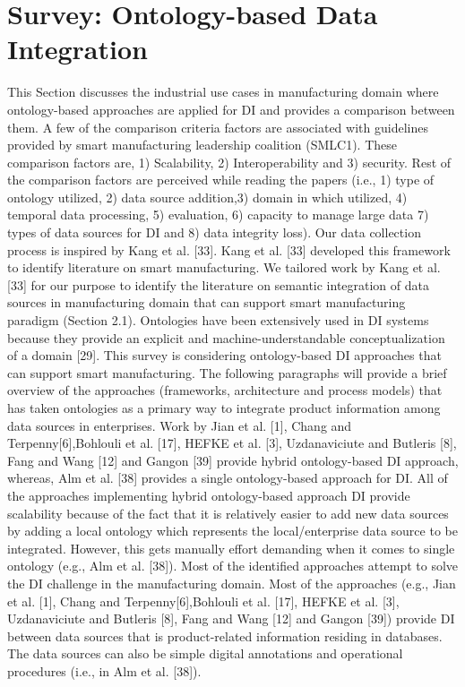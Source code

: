 \section{Survey: Ontology-based Data Integration}
\label{sec:Survey}
\vspace{-.3cm}
This Section discusses the industrial use cases in manufacturing domain where ontology-based approaches are applied for DI and provides a comparison between them. A few of the comparison criteria factors are associated with guidelines provided by smart manufacturing leadership coalition (SMLC1). These comparison factors are, 1) Scalability, 2) Interoperability and 3) security. Rest of the comparison factors are perceived while reading the papers (i.e., 1) type of ontology utilized, 2) data source addition,3) domain in which utilized, 4) temporal data processing, 5) evaluation, 6) capacity to manage large data 7) types of data sources for DI and 8) data integrity loss). Our data collection process is inspired by Kang et al. [33]. Kang et al. [33] developed this framework to identify literature on smart manufacturing. We tailored work by Kang et al. [33] for our purpose to identify the literature on semantic integration of data sources in manufacturing domain that can support smart manufacturing paradigm (Section 2.1).
Ontologies have been extensively used in DI systems because they provide an explicit and machine-understandable conceptualization of a domain [29]. This survey is considering ontology-based DI approaches that can support smart manufacturing. The following paragraphs will provide a brief overview of the approaches (frameworks, architecture and process models) that has taken ontologies as a primary way to integrate product information among data sources in enterprises.
Work by Jian et al. [1], Chang and Terpenny[6],Bohlouli et al. [17], HEFKE et al. [3], Uzdanaviciute and Butleris [8], Fang and Wang [12] and Gangon [39] provide hybrid ontology-based DI approach, whereas,  Alm et al. [38] provides a single ontology-based approach for DI. All of the approaches implementing hybrid ontology-based approach DI provide scalability because of the fact that it is relatively easier to add new data sources by adding a local ontology which represents the local/enterprise data source to be integrated. However, this gets manually effort demanding when it comes to single ontology (e.g., Alm et al. [38]). Most of the identified approaches attempt to solve the DI challenge in the manufacturing domain. Most of the approaches (e.g., Jian et al. [1], Chang and Terpenny[6],Bohlouli et al. [17], HEFKE et al. [3], Uzdanaviciute and Butleris [8], Fang and Wang [12] and Gangon [39]) provide DI between data sources that is product-related information residing in databases. The data sources can also be simple digital annotations and operational procedures (i.e., in Alm et al. [38]). 
